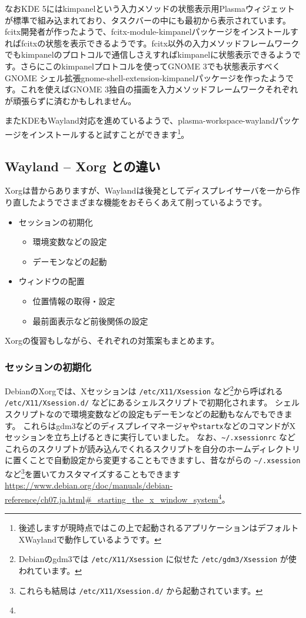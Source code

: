 \documentclass[mingoth,a4paper]{jsarticle}
\begin{document}
なおKDE 5にはkimpanelという入力メソッドの状態表示用Plasmaウィジェットが標準で組み込まれており、タスクバーの中にも最初から表示されています。fcitx開発者が作ったようで、fcitx-module-kimpanelパッケージをインストールすればfcitxの状態を表示できるようです。fcitx以外の入力メソッドフレームワークでもkimpanelのプロトコルで通信しさえすればkimpanelに状態表示できるようです。さらにこのkimpanelプロトコルを使ってGNOME 3でも状態表示すべくGNOME シェル拡張gnome-shell-extension-kimpanelパッケージを作ったようです。これを使えばGNOME 3独自の描画を入力メソッドフレームワークそれぞれが頑張らずに済むかもしれません。

またKDEもWayland対応を進めているようで、plasma-workspace-waylandパッケージをインストールすると試すことができます\footnote{後述しますが現時点ではこの上で起動されるアプリケーションはデフォルトXWaylandで動作しているようです。}。

\subsection{Wayland -- Xorg との違い}
Xorgは昔からありますが、Waylandは後発としてディスプレイサーバを一から作り直したようでさまざまな機能をおそらくあえて削っているようです。

\begin{itemize}
 \item セッションの初期化
 \begin{itemize}
  \item 環境変数などの設定
  \item デーモンなどの起動
 \end{itemize}
 \item ウィンドウの配置
 \begin{itemize}
  \item 位置情報の取得・設定
  \item 最前面表示など前後関係の設定
 \end{itemize}
\end{itemize}

Xorgの復習もしながら、それぞれの対策案もまとめます。

\subsubsection{セッションの初期化}
DebianのXorgでは、Xセッションは \verb|/etc/X11/Xsession| など\footnote{Debianのgdm3では \texttt{/etc/X11/Xsession} に似せた \texttt{/etc/gdm3/Xsession} が使われています。}から呼ばれる \verb|/etc/X11/Xsession.d/| などにあるシェルスクリプトで初期化されます。
シェルスクリプトなので環境変数などの設定もデーモンなどの起動もなんでもできます。
これらはgdm3などのディスプレイマネージャや\verb|startx|などのコマンドがXセッションを立ち上げるときに実行していました。
なお、\verb|~/.xsessionrc| などこれらのスクリプトが読み込んでくれるスクリプトを自分のホームディレクトリに置くことで自動設定から変更することもできますし、昔ながらの \verb|~/.xsession|など\footnote{これらも結局は \texttt{/etc/X11/Xsession.d/} から起動されています。}を置いてカスタマイズすることもできます\urldef{\startingxurl}\url{https://www.debian.org/doc/manuals/debian-reference/ch07.ja.html#_starting_the_x_window_system}\footnote{\startingxurl}。
\end{document}
